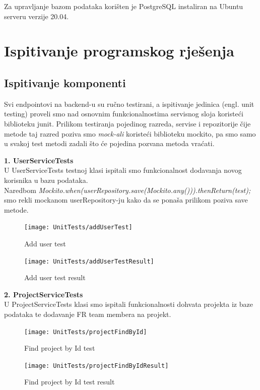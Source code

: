             {Za upravljanje bazom podataka korišten je PostgreSQL\footnotemark{} instaliran na Ubuntu serveru\footnotemark{} verzije 20.04.}
			
			\eject 
		
	
		\section{Ispitivanje programskog rješenja}
			
			\subsection{Ispitivanje komponenti}
			{Svi endpointovi na backend-u su ručno testirani, a ispitivanje jedinica (engl. unit testing) proveli smo nad osnovnim funkcionalnostima servisnog sloja koristeći biblioteku junit. Prilikom testiranja pojedinog razreda, servise i repozitorije čije metode taj razred poziva smo \textit{mock-ali} koristeći biblioteku mockito, pa smo samo u svakoj test metodi zadali što će pojedina pozvana metoda vraćati.}
			
			\textbf{1. UserServiceTests\\}
			{U UserServiceTests testnoj klasi ispitali smo funkcionalnost dodavanja novog korisnika u bazu podataka.\\
			Naredbom \textit{Mockito.when(userRepository.save(Mockito.any())).thenReturn(test);} smo rekli mockanom userRepository-ju kako da se ponaša prilikom poziva save metode.}
			\begin{figure}[H]
				\texttt{[image: UnitTests/addUserTest]}
				\centering
				\caption{Add user test}
				\label{fig:addUserTest}
			\end{figure}
			\begin{figure}[H]
				\texttt{[image: UnitTests/addUserTestResult]}
				\centering
				\caption{Add user test result}
				\label{fig:addUserTestResult}
			\end{figure}
			
			\textbf{2. ProjectServiceTests\\}
			{U ProjectServiceTests klasi smo ispitali funkcionalnosti dohvata projekta iz baze podataka te dodavanje FR team membera na projekt.}
			\begin{figure}[H]
				\texttt{[image: UnitTests/projectFindById]}
				\centering
				\caption{Find project by Id test}
				\label{fig:projectFindByIdTest}
			\end{figure}
			\begin{figure}[H]
				\texttt{[image: UnitTests/projectFindByIdResult]}
				\centering
				\caption{Find project by Id test result}
				\label{fig:projectFindByIdResult}
			\end{figure}

